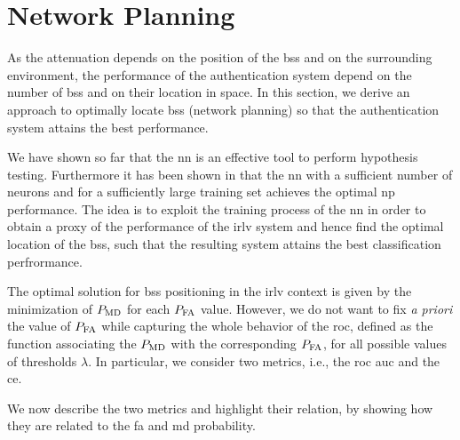 \documentclass[conference]{IEEEtran}
\begin{document}
\section{Network Planning}\label{sec:bsPos}

As the attenuation depends on the position of the \acp{bs} and on the surrounding environment, the performance of the authentication system depend on the number of \acp{bs} and on their location in space. In this section, we derive an approach to optimally locate \acp{bs} (network planning) so that the authentication system attains the best performance. 

We have shown so far that the \ac{nn} is an effective tool to perform hypothesis testing. Furthermore it has been shown in \cite{nostro} that the \ac{nn} with a sufficient number of neurons and for a sufficiently large training set achieves the optimal \ac{np} performance. The idea is to exploit the training process of the \ac{nn} in order to obtain a proxy of the performance of the \ac{irlv} system and hence find the optimal location of the \acp{bs}, such that the resulting system attains the best classification perfrormance.

The optimal solution for \acp{bs} positioning in the \ac{irlv} context is given by the minimization of $P_{\rm MD}$ for each $P_{\rm FA}$ value. However, we do not want to fix {\em a priori} the value of $P_{\rm FA}$ while capturing the whole behavior of the \ac{roc}, defined as the  function associating the $P_{\rm MD}$ with the corresponding $P_{\rm FA}$, for all possible values of thresholds $\lambda$. In particular, we consider two metrics, i.e., the   \ac{roc} \ac{auc} \cite{hanley-82} and the \ac{ce}. 

We now describe the two metrics and highlight their relation, by showing how they  are related to the \ac{fa} and \ac{md} probability.
\end{document}
